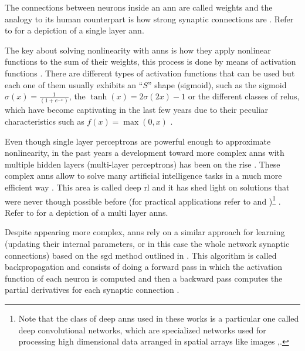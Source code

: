 \documentclass[draft=false]{seal_thesis}
\begin{document}
The connections between neurons inside an \gls{ann} are called weights and the analogy to its human counterpart is how strong synaptic connections are \citep[p. 216]{Sutton2017}. Refer to  for a depiction of a single layer \gls{ann}.

The key about solving nonlinearity with \glspl{ann} is how they apply nonlinear functions to the sum of their weights, this process is done by means of activation functions \citep[p. 216]{Sutton2017}. There are different types of activation functions that can be used but each one of them usually exhibits an ``$S$'' shape (\ie sigmoid), such as the sigmoid $\sigma(x) = \frac{1}{(1+e^{-x})}$, the $\tanh(x) = 2\sigma(2x)-1$ or the different classes of \glspl{relu}, which have become captivating in the last few years due to their peculiar characteristics such as $f(x) = \max(0,x)$ \citep[p. 216]{Sutton2017}.


Even though single layer perceptrons are powerful enough to approximate nonlinearity, in the past years a development toward more complex \glspl{ann} with multiple hidden layers (\ie multi-layer perceptrons) has been on the rise \citep[p. 217]{Sutton2017}. These complex \glspl{ann} allow to solve many artificial intelligence tasks in a much more efficient way \citep{Bengio2009}. This area is called deep \gls{rl} and it has shed light on solutions that were never though possible before (for practical applications refer to \citet{Mnih2015} and \citet{Silver2016})\footnote{Note that the class of deep \glspl{ann} used in these works is a particular one called deep convolutional networks, which are specialized networks used for processing high dimensional data arranged in spatial arrays like images \citep[p. 219]{Sutton2017},\citep{Lecun1998}.} \citep{Bengio2009}. Refer to  for a depiction of a multi layer \glspl{ann}.


Despite appearing more complex, \glspl{ann} rely on a similar approach for learning (\ie updating their internal parameters, or in this case the whole network synaptic connections) based on the \gls{sgd} method outlined in  \citep[p. 217]{Sutton2017}. This algorithm is called backpropagation and consists of doing a forward pass in which the activation function of each neuron is computed and then a backward pass computes the partial derivatives for each synaptic connection \citep[p. 218]{Sutton2017}.
\end{document}
